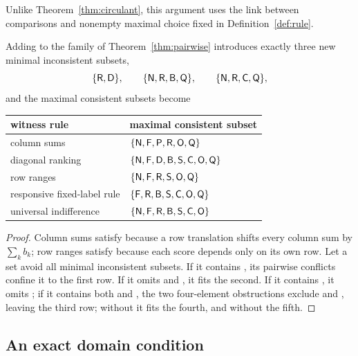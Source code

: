 Unlike Theorem~\ref{thm:circulant}, this argument uses the link between comparisons and nonempty
maximal choice fixed in Definition~\ref{def:rule}.

\begin{theorem}\label{thm:augmented}
Adding  to the family of Theorem~\ref{thm:pairwise} introduces exactly three new minimal
inconsistent subsets,
\[
  \{\textup{\textsf{R}},\textup{\textsf{D}}\},\qquad\{\textup{\textsf{N}},\textup{\textsf{R}},\textup{\textsf{B}},\textup{\textsf{Q}}\},\qquad\{\textup{\textsf{N}},\textup{\textsf{R}},\textup{\textsf{C}},\textup{\textsf{Q}}\},
\]
and the maximal consistent subsets become
\begin{center}
\small
\begin{tabular}{@{}ll@{}}
  \toprule
  witness rule & maximal consistent subset \\
  \midrule
  column sums & $\{\textup{\textsf{N}},\textup{\textsf{F}},\textup{\textsf{P}},\textup{\textsf{R}},\textup{\textsf{O}},\textup{\textsf{Q}}\}$ \\
  diagonal ranking & $\{\textup{\textsf{N}},\textup{\textsf{F}},\textup{\textsf{D}},\textup{\textsf{B}},\textup{\textsf{S}},\textup{\textsf{C}},\textup{\textsf{O}},\textup{\textsf{Q}}\}$ \\
  row ranges & $\{\textup{\textsf{N}},\textup{\textsf{F}},\textup{\textsf{R}},\textup{\textsf{S}},\textup{\textsf{O}},\textup{\textsf{Q}}\}$ \\
  responsive fixed-label rule & $\{\textup{\textsf{F}},\textup{\textsf{R}},\textup{\textsf{B}},\textup{\textsf{S}},\textup{\textsf{C}},\textup{\textsf{O}},\textup{\textsf{Q}}\}$ \\
  universal indifference & $\{\textup{\textsf{N}},\textup{\textsf{F}},\textup{\textsf{R}},\textup{\textsf{B}},\textup{\textsf{S}},\textup{\textsf{C}},\textup{\textsf{O}}\}$ \\
  \bottomrule
\end{tabular}
\end{center}
\end{theorem}

\begin{proof}
Column sums satisfy  because a row translation shifts every column sum by $\sum_kb_k$; row ranges
satisfy  because each score depends only on its own row. Let a set avoid all minimal
inconsistent subsets. If it contains , its pairwise conflicts confine it to the first row. If it
omits  and , it fits the second. If it contains , it omits ; if it contains both
 and , the two four-element obstructions exclude  and , leaving the third row;
without  it fits the fourth, and without  the fifth.
\end{proof}

\subsection{An exact domain condition}

